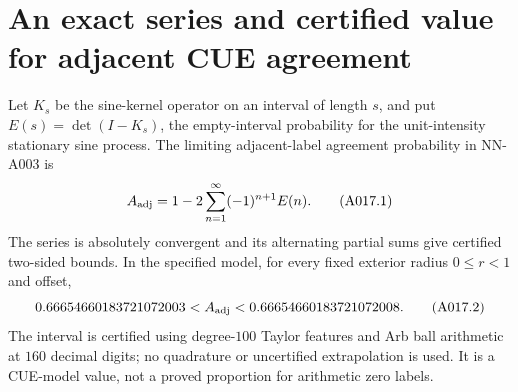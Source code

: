 \section{An exact series and certified value for adjacent CUE agreement}

\begin{theorem}
Let $K_s$ be the sine-kernel operator on an interval of length $s$,
and put $E(s)=\det(I-K_s)$, the empty-interval probability for the
unit-intensity stationary sine process. The limiting adjacent-label
agreement probability in NN-A003 is
\[
 A_{\rm adj}=1-2\sum_{n=1}^\infty(-1)^{n+1}E(n).
                                                        \tag{A017.1}
\]
The series is absolutely convergent and its alternating partial sums
give certified two-sided bounds. In the specified model, for every
fixed exterior radius $0\le r<1$ and offset,
\[
 0.66654660183721072003
 < A_{\rm adj} <
 0.66654660183721072008.                                \tag{A017.2}
\]
The interval is certified using degree-$100$ Taylor features and
Arb ball arithmetic at $160$ decimal digits; no quadrature or
uncertified extrapolation is used. It is a CUE-model value, not a
proved proportion for arithmetic zero labels.
\end{theorem}

